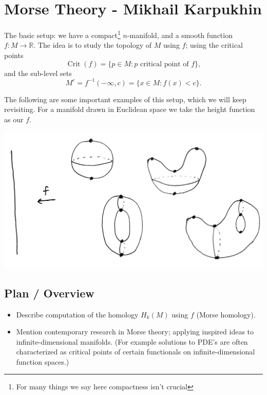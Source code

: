 \documentclass{article}
\theoremstyle{definition}
\DeclareMathOperator{\Crit}{Crit}
\newcommand{\R}{\mathbb{R}}
\begin{document}
\section{Morse Theory - Mikhail Karpukhin}

The basic setup: we have a compact\footnote{For many things we say here
compactness isn't crucial} $n$-manifold, and a smooth function $f:M\to\R$. The
idea is to study the topology of $M$ using $f$; using the critical points
\begin{equation*}
    \Crit(f) = \{p\in M:\text{$p$ critical point of $f$}\},
\end{equation*}
and the sub-level sets
\begin{equation*}
    M^c = f^{-1}(-\infty,c) = \{x\in M:f(x)<c\}.
\end{equation*}

The following are some important examples of this setup, which we will keep
revisiting. For a manifold drawn in Euclidean space we take the height function
as our $f$.

\begin{center}
    \includegraphics[scale=0.13]{morse_examples}
\end{center}

\subsection*{Plan / Overview}

\begin{itemize}
    \item Describe computation of the homology $H_k(M)$ using $f$ (Morse
        homology).

    \item Mention contemporary research in Morse theory; applying inspired ideas
        to infinite-dimensional manifolds. (For example solutions to PDE's are
        often characterized as critical points of certain functionals on
        infinite-dimensional function spaces.)
\end{itemize}
\end{document}
